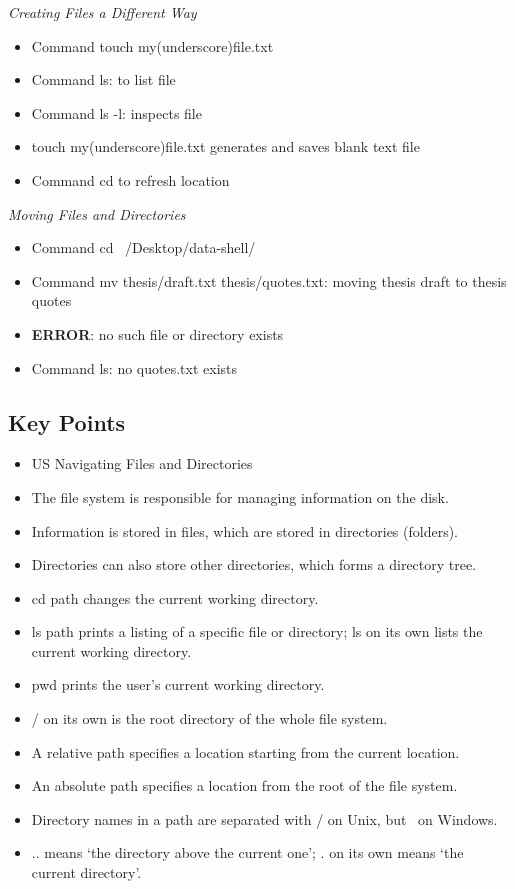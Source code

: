 \documentclass{article}
\begin{document}
\textit{Creating Files a Different Way}
\begin{itemize}
\item Command touch my(underscore)file.txt
\item Command ls: to list file
\item Command ls -l: inspects file 
\item touch my(underscore)file.txt generates and saves blank text file
\item Command cd to refresh location
\end{itemize}
\textit{Moving Files and Directories}
\begin{itemize}
\item Command cd ~/Desktop/data-shell/
\item Command mv thesis/draft.txt thesis/quotes.txt: moving thesis draft to thesis quotes 
\item \textbf{ERROR}: no such file or directory exists
\item Command ls: no quotes.txt exists
\end{itemize}

\subsection{Key Points}
\begin{itemize}
\item US Navigating Files and Directories
\item The file system is responsible for managing information on the disk.
\item Information is stored in files, which are stored in directories (folders).
\item Directories can also store other directories, which forms a directory tree.
\item cd path changes the current working directory.
\item ls path prints a listing of a specific file or directory; ls on its own lists the current working directory.
\item pwd prints the user’s current working directory.
\item / on its own is the root directory of the whole file system.
\item A relative path specifies a location starting from the current location.
\item An absolute path specifies a location from the root of the file system.
\item Directory names in a path are separated with / on Unix, but \ on Windows.
\item .. means ‘the directory above the current one’; . on its own means ‘the current directory’.
\end{itemize}
\end{document}
